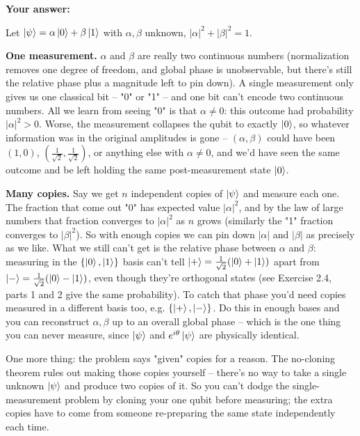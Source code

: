 \documentclass[11pt]{article}
\begin{document}
\textbf{Your answer:}

Let $\ket{\psi} = \alpha\ket{0} + \beta\ket{1}$ with $\alpha,\beta$ unknown, $|\alpha|^2+|\beta|^2=1$.

\textbf{One measurement.} $\alpha$ and $\beta$ are really two continuous numbers (normalization removes one degree of freedom, and global phase is unobservable, but there's still the relative phase plus a magnitude left to pin down). A single measurement only gives us one classical bit -- "0" or "1" -- and one bit can't encode two continuous numbers. All we learn from seeing "0" is that $\alpha \ne 0$: this outcome had probability $|\alpha|^2 > 0$. Worse, the measurement collapses the qubit to exactly $\ket 0$, so whatever information was in the original amplitudes is gone -- $(\alpha,\beta)$ could have been $(1,0)$, $(\tfrac{1}{\sqrt2},\tfrac{1}{\sqrt2})$, or anything else with $\alpha \ne 0$, and we'd have seen the same outcome and be left holding the same post-measurement state $\ket0$.

\textbf{Many copies.} Say we get $n$ independent copies of $\ket\psi$ and measure each one. The fraction that come out "0" has expected value $|\alpha|^2$, and by the law of large numbers that fraction converges to $|\alpha|^2$ as $n$ grows (similarly the "1" fraction converges to $|\beta|^2$). So with enough copies we can pin down $|\alpha|$ and $|\beta|$ as precisely as we like. What we still can't get is the relative phase between $\alpha$ and $\beta$: measuring in the $\{\ket0,\ket1\}$ basis can't tell $\ket+ = \tfrac{1}{\sqrt2}(\ket0+\ket1)$ apart from $\ket- = \tfrac{1}{\sqrt2}(\ket0-\ket1)$, even though they're orthogonal states (see Exercise 2.4, parts 1 and 2 give the same probability). To catch that phase you'd need copies measured in a different basis too, e.g. $\{\ket+,\ket-\}$. Do this in enough bases and you can reconstruct $\alpha,\beta$ up to an overall global phase -- which is the one thing you can never measure, since $\ket\psi$ and $e^{i\theta}\ket\psi$ are physically identical.

One more thing: the problem says "given" copies for a reason. The no-cloning theorem rules out making those copies yourself -- there's no way to take a single unknown $\ket\psi$ and produce two copies of it. So you can't dodge the single-measurement problem by cloning your one qubit before measuring; the extra copies have to come from someone re-preparing the same state independently each time.

\vspace{1cm}
\end{document}

